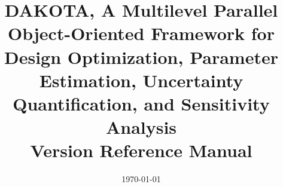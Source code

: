 \documentclass[ps2pdf,11pt,report]{SANDreport}
\title{DAKOTA, A Multilevel Parallel Object-Oriented Framework for 
Design Optimization, Parameter Estimation, Uncertainty Quantification, 
and Sensitivity Analysis\\\vspace{5mm}Version \DakotaVersion\space Reference Manual}
\author{\DakotaAuthorLong}
\date{\today}
\begin{document}
\maketitle

\begin{abstract}
\DakotaAbstractShared
\DakotaAbstractRef
\end{abstract}

\setcounter{page}{3}
\clearemptydoublepage

\tableofcontents
\clearemptydoublepage

\SANDmain 

\end{document}
